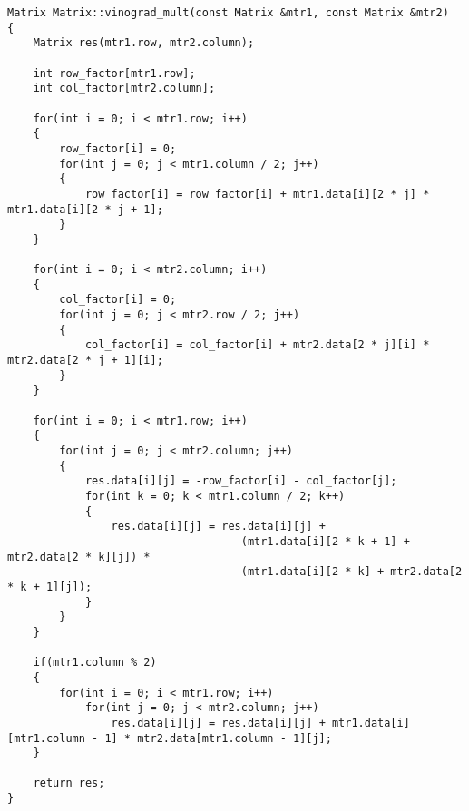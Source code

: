 \documentclass[a4paper, 14pt]{article}
\begin{document}
	\begin{lstlisting}[label=some-code,caption=Алгоритм Винограда]
Matrix Matrix::vinograd_mult(const Matrix &mtr1, const Matrix &mtr2)
{
    Matrix res(mtr1.row, mtr2.column);

    int row_factor[mtr1.row];
    int col_factor[mtr2.column];

    for(int i = 0; i < mtr1.row; i++)
    {
        row_factor[i] = 0;
        for(int j = 0; j < mtr1.column / 2; j++)
        {
            row_factor[i] = row_factor[i] + mtr1.data[i][2 * j] * mtr1.data[i][2 * j + 1];
        }
    }

    for(int i = 0; i < mtr2.column; i++)
    {
        col_factor[i] = 0;
        for(int j = 0; j < mtr2.row / 2; j++)
        {
            col_factor[i] = col_factor[i] + mtr2.data[2 * j][i] * mtr2.data[2 * j + 1][i];
        }
    }

    for(int i = 0; i < mtr1.row; i++)
    {
        for(int j = 0; j < mtr2.column; j++)
        {
            res.data[i][j] = -row_factor[i] - col_factor[j];
            for(int k = 0; k < mtr1.column / 2; k++)
            {
                res.data[i][j] = res.data[i][j] +
                                    (mtr1.data[i][2 * k + 1] + mtr2.data[2 * k][j]) *
                                    (mtr1.data[i][2 * k] + mtr2.data[2 * k + 1][j]);
            }
        }
    }
    
    if(mtr1.column % 2)
    {
        for(int i = 0; i < mtr1.row; i++)
            for(int j = 0; j < mtr2.column; j++)
                res.data[i][j] = res.data[i][j] + mtr1.data[i][mtr1.column - 1] * mtr2.data[mtr1.column - 1][j];
    }

    return res;
}
\end{lstlisting}
\end{document}
